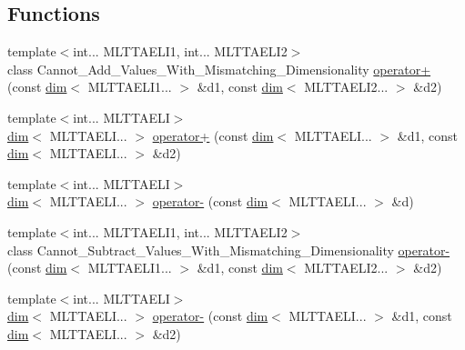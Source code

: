 \subsection*{Functions}
\begin{DoxyCompactItemize}
\item 
{\footnotesize template$<$int... M\+L\+T\+T\+A\+E\+L\+I1, int... M\+L\+T\+T\+A\+E\+L\+I2$>$ }\\class Cannot\+\_\+\+Add\+\_\+\+Values\+\_\+\+With\+\_\+\+Mismatching\+\_\+\+Dimensionality \hyperlink{namespacemui_1_1dim_a3f4c4c80924f6f8f409a0c80894e15a2}{operator+} (const \hyperlink{structmui_1_1dim_1_1dim}{dim}$<$ M\+L\+T\+T\+A\+E\+L\+I1... $>$ \&d1, const \hyperlink{structmui_1_1dim_1_1dim}{dim}$<$ M\+L\+T\+T\+A\+E\+L\+I2... $>$ \&d2)
\item 
{\footnotesize template$<$int... M\+L\+T\+T\+A\+E\+LI$>$ }\\\hyperlink{structmui_1_1dim_1_1dim}{dim}$<$ M\+L\+T\+T\+A\+E\+L\+I... $>$ \hyperlink{namespacemui_1_1dim_ae596cbebd6adc9e7bf6f67055a1515ea}{operator+} (const \hyperlink{structmui_1_1dim_1_1dim}{dim}$<$ M\+L\+T\+T\+A\+E\+L\+I... $>$ \&d1, const \hyperlink{structmui_1_1dim_1_1dim}{dim}$<$ M\+L\+T\+T\+A\+E\+L\+I... $>$ \&d2)
\item 
{\footnotesize template$<$int... M\+L\+T\+T\+A\+E\+LI$>$ }\\\hyperlink{structmui_1_1dim_1_1dim}{dim}$<$ M\+L\+T\+T\+A\+E\+L\+I... $>$ \hyperlink{namespacemui_1_1dim_a9a33b90adf44c8801b8368000eed7588}{operator-\/} (const \hyperlink{structmui_1_1dim_1_1dim}{dim}$<$ M\+L\+T\+T\+A\+E\+L\+I... $>$ \&d)
\item 
{\footnotesize template$<$int... M\+L\+T\+T\+A\+E\+L\+I1, int... M\+L\+T\+T\+A\+E\+L\+I2$>$ }\\class Cannot\+\_\+\+Subtract\+\_\+\+Values\+\_\+\+With\+\_\+\+Mismatching\+\_\+\+Dimensionality \hyperlink{namespacemui_1_1dim_aecf5041eca941689d71d01af8fa7c6a3}{operator-\/} (const \hyperlink{structmui_1_1dim_1_1dim}{dim}$<$ M\+L\+T\+T\+A\+E\+L\+I1... $>$ \&d1, const \hyperlink{structmui_1_1dim_1_1dim}{dim}$<$ M\+L\+T\+T\+A\+E\+L\+I2... $>$ \&d2)
\item 
{\footnotesize template$<$int... M\+L\+T\+T\+A\+E\+LI$>$ }\\\hyperlink{structmui_1_1dim_1_1dim}{dim}$<$ M\+L\+T\+T\+A\+E\+L\+I... $>$ \hyperlink{namespacemui_1_1dim_af677963a0b834fb28bd28c58135e8243}{operator-\/} (const \hyperlink{structmui_1_1dim_1_1dim}{dim}$<$ M\+L\+T\+T\+A\+E\+L\+I... $>$ \&d1, const \hyperlink{structmui_1_1dim_1_1dim}{dim}$<$ M\+L\+T\+T\+A\+E\+L\+I... $>$ \&d2)

\end{DoxyCompactItemize}
